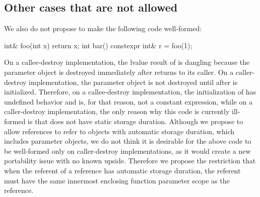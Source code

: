 \documentclass{wg21}
\begin{document}
\subsection{Other cases that are not allowed}

We also do not propose to make the following code well-formed:

\begin{colorblock}
int& foo(int x) { return x; }
int bar() {
    constexpr int& r = foo(1);
}
\end{colorblock}

On a callee-destroy implementation, the lvalue result of  is
dangling because the parameter object  is destroyed immediately after
 returns to its caller. On a caller-destroy implementation, the
parameter object  is not destroyed until after  is
initialized. Therefore, on a callee-destroy implementation, the initialization
of  has undefined behavior and is, for that reason, not a constant
expression, while on a caller-destroy implementation, the only reason why this
code is currently ill-formed is that  does not have static
storage duration. Although we propose to allow  references to
refer to objects with automatic storage duration, which includes parameter
objects, we do not think it is desirable for the above code to be well-formed
only on caller-destroy implementations, as it would create a new portability
issue with no known upside. Therefore we propose the restriction that when the
referent of a  reference has automatic storage duration, the
referent must have the same innermost enclosing function parameter scope as the
reference.
\end{document}
